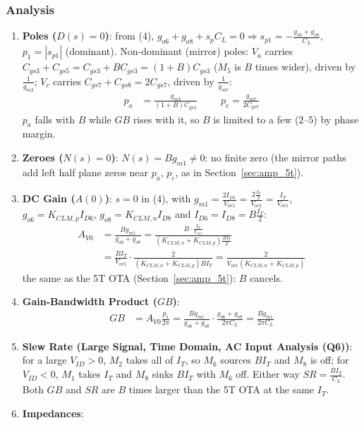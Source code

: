 \subsubsection{Analysis}
\begin{enumerate}
  \item \textbf{Poles (\(D(s) = 0\))}: from (4),
    \(g_{o6} + g_{o8} + s_p C_L = 0 \Rightarrow s_{p1} = -\frac{g_{o6} + g_{o8}}{C_L}\), \(p_1 = |s_{p1}|\) (dominant).
    Non-dominant (mirror) poles: \(V_a\) carries \(C_{gs3} + C_{gs5} = C_{gs3} + B C_{gs3} = (1 + B) C_{gs3}\)
    (\(M_5\) is \(B\) times wider), driven by \(\frac{1}{g_{m3}}\); \(V_c\) carries
    \(C_{gs7} + C_{gs8} = 2 C_{gs7}\), driven by \(\frac{1}{g_{m7}}\):
    \begin{align*}
      p_a &= \frac{g_{m3}}{(1 + B) C_{gs3}} \hspace{1cm} p_c = \frac{g_{m7}}{2 C_{gs7}}
    \end{align*}
    \(p_a\) falls with \(B\) while \(GB\) rises with it, so \(B\) is limited to a few
    (2--5) by phase margin.
  \item \textbf{Zeroes (\(N(s) = 0\))}: \(N(s) = B g_{m1} \neq 0\): no finite zero (the mirror paths add
    left half plane zeros near \(p_a\), \(p_c\), as in Section~\ref{sec:amp_5t}).
  \item \textbf{DC Gain (\(A(0)\))}: \(s = 0\) in (4), with \(g_{m1} = \frac{2 I_{D1}}{V_{ov1}} = \frac{2 \frac{I_T}{2}}{V_{ov1}} = \frac{I_T}{V_{ov1}}\),
    \(g_{o6} = K_{CLM,p} I_{D6}\), \(g_{o8} = K_{CLM,n} I_{D8}\) and \(I_{D6} = I_{D8} = B\frac{I_T}{2}\):
    \begin{align*}
      A_{V0} &= \frac{B g_{m1}}{g_{o6} + g_{o8}} = \frac{B \cdot \frac{I_T}{V_{ov1}}}{(K_{CLM,n} + K_{CLM,p}) \frac{B I_T}{2}} \\
             &= \frac{B I_T}{V_{ov1}}\cdot\frac{2}{(K_{CLM,n} + K_{CLM,p}) B I_T} = \frac{2}{V_{ov1}(K_{CLM,n} + K_{CLM,p})}
    \end{align*}
    the same as the 5T OTA (Section~\ref{sec:amp_5t}): \(B\) cancels.
  \item \textbf{Gain-Bandwidth Product (\(GB\))}:
    \begin{align*}
      GB &= A_{V0}\frac{p_1}{2\pi} = \frac{B g_{m1}}{g_{o6} + g_{o8}}\cdot\frac{g_{o6} + g_{o8}}{2\pi C_L} = \frac{B g_{m1}}{2\pi C_L}
    \end{align*}
  \item \textbf{Slew Rate (Large Signal, Time Domain, AC Input Analysis (Q6))}:
    for a large \(V_{ID} > 0\), \(M_2\) takes all of \(I_T\), so \(M_6\) sources
    \(B I_T\) and \(M_8\) is off; for \(V_{ID} < 0\), \(M_1\) takes \(I_T\) and \(M_8\)
    sinks \(B I_T\) with \(M_6\) off. Either way \(SR = \frac{B I_T}{C_L}\). Both
    \(GB\) and \(SR\) are \(B\) times larger than the 5T OTA at the same \(I_T\).
  \item \textbf{Impedances}:

\end{enumerate}
